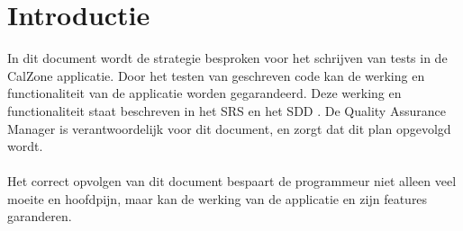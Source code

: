 \chapter{Introductie}
In dit document wordt de strategie besproken voor het schrijven van tests in de CalZone \cite{calz} applicatie.
Door het testen van geschreven code kan de werking en functionaliteit van de applicatie worden gegarandeerd.
Deze werking en functionaliteit staat beschreven in het SRS \cite{srs} en het SDD \cite{sdd}.
De Quality Assurance Manager is verantwoordelijk voor dit document, en zorgt dat dit plan opgevolgd wordt.
\\
\\
Het correct opvolgen van dit document bespaart de programmeur niet alleen veel moeite en hoofdpijn, maar kan de werking van de applicatie en zijn features garanderen. 